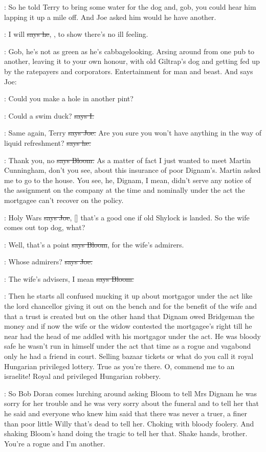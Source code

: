 \Nq:
So he told Terry to bring some water for the dog and,
gob,
you could
hear him lapping it up a mile off.
And Joe asked him would he have
another.%

\citizen:
I will
\sout{says he},
,
to show there's no ill feeling.

\Nq:
Gob,
he's not as green as he's cabbagelooking.
Arsing around from
one pub to another,
leaving it to your own honour,
with old Giltrap's dog
and getting fed up by the ratepayers and corporators.
Entertainment for
man and beast.
And says Joe:

\joe:
Could you make a hole in another pint?

:
Could a swim duck?
\sout{says I.}

\joe:
Same again,
Terry
\sout{says Joe.}
Are you sure you won't have anything in the
way of liquid refreshment?
\sout{says he.}

\Bloom:
Thank you,
no
\sout{says Bloom.}
As a matter of fact I just wanted to meet
Martin Cunningham,
don't you see,
about this insurance of poor Dignam's.
Martin asked me to go to the house.
You see,
he,
Dignam,
I mean,
didn't
serve any notice of the assignment on the company at the time and
nominally under the act the mortgagee can't recover on the policy.

\joe:
Holy Wars
\sout{says Joe},
[] that's a good one if old Shylock is
landed.
So the wife comes out top dog,
what?

\Bloom:
Well,
that's a point
\sout{says Bloom},
for the wife's admirers.

\joe:
Whose admirers?
\sout{says Joe.}

\Bloom:
The wife's advisers,
I mean
\sout{says Bloom.}

\Nq:
Then he starts all confused
mucking it up about mortgagor under the act
like the lord chancellor giving it out on the bench and for the benefit of
the wife and that a trust is created but on the other hand that Dignam
owed Bridgeman the money and if now the wife or the widow contested the
mortgagee's right till he near had the head of me addled with his
mortgagor under the act.
He was bloody safe he wasn't run in himself under
the act that time as a rogue and vagabond only he had a friend in court.
Selling bazaar tickets or what do you call it royal Hungarian privileged
lottery.
True as you're there.
O,
commend me to an israelite!
Royal and
privileged Hungarian robbery.

\Nq:
So Bob Doran comes lurching around
asking Bloom to tell Mrs
Dignam he was sorry for her trouble and he was very sorry about the
funeral and to tell her that he said and everyone who knew him said that
there was never a truer,
a finer than poor little Willy that's dead to tell
her.
Choking with bloody foolery.
And shaking Bloom's hand doing the
tragic to tell her that.
Shake hands,
brother.
You're a rogue and I'm
another.

